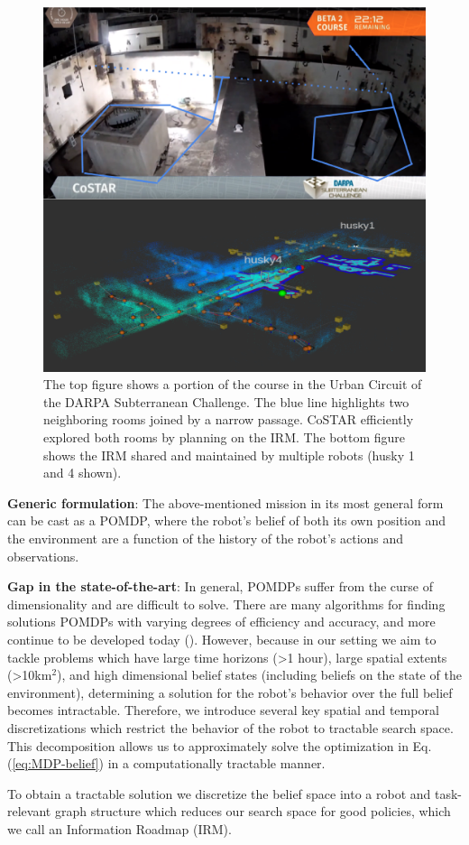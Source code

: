 \documentclass{article}
\newcommand{\ph}[1]{{\textbf{#1}:}} %
\begin{document}
\begin{figure}[t!]
  \centering
  \includegraphics[width=.48\textwidth]{figures/firstpage_v2.png}
  \caption{The top figure shows a portion of the course in the Urban Circuit of the DARPA Subterranean Challenge. The blue line highlights two neighboring rooms joined by a narrow passage. CoSTAR efficiently explored both rooms by planning on the IRM. The bottom figure shows the IRM shared and maintained by multiple robots (husky 1 and 4 shown).}
  \label{fig:firstPage}
\end{figure}


\ph{Generic formulation}
The above-mentioned mission in its most general form can be cast as a POMDP, where the robot's belief of both its own position and the environment are a function of the history of the robot's actions and observations.  

\ph{Gap in the state-of-the-art}
In general, POMDPs suffer from the curse of dimensionality and are difficult to solve.  There are many algorithms for finding solutions POMDPs with varying degrees of efficiency and accuracy, and more continue to be developed today (\cite{silver2010monte,somani2013despot,bonet1998learning,kim2019pomhdp}).  However, because in our setting we aim to tackle problems which have large time horizons (>1 hour), large spatial extents (>10km$^2$), and high dimensional belief states (including beliefs on the state of the environment), determining a solution for the robot's behavior over the full belief becomes intractable.  Therefore, we introduce several key spatial and temporal discretizations which restrict the behavior of the robot to tractable search space.  This decomposition allows us to approximately solve the optimization in Eq. (\ref{eq:MDP-belief}) in a computationally tractable manner.

To obtain a tractable solution we discretize the belief space into a robot and task-relevant graph structure which reduces our search space for good policies, which we call an Information Roadmap (IRM).
\end{document}

